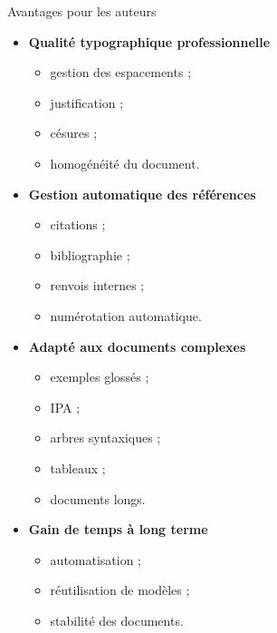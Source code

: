 \documentclass[aspectratio=169]{beamer}
\begin{document}
	\begin{frame}{Avantages pour les auteurs}
		\begin{itemize}
			\item \textbf{Qualité typographique professionnelle}
			\begin{itemize}
				\item gestion des espacements ;
				\item justification ;
				\item césures ;
				\item homogénéité du document.
			\end{itemize}
			
			\vspace{0.3cm}
			
			\item \textbf{Gestion automatique des références}
			\begin{itemize}
				\item citations ;
				\item bibliographie ;
				\item renvois internes ;
				\item numérotation automatique.
			\end{itemize}
			
			\vspace{0.3cm}
			
			\item \textbf{Adapté aux documents complexes}
			\begin{itemize}
				\item exemples glossés ;
				\item IPA ;
				\item arbres syntaxiques ;
				\item tableaux ;
				\item documents longs.
			\end{itemize}
			
			\vspace{0.3cm}
			
			\item \textbf{Gain de temps à long terme}
			\begin{itemize}
				\item automatisation ;
				\item réutilisation de modèles ;
				\item stabilité des documents.
			\end{itemize}
		\end{itemize}
	\end{frame}
	
\end{document}
